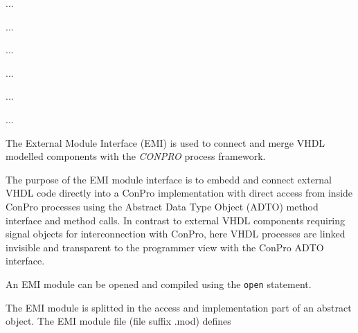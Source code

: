\documentclass[a4paper,12pt,twoside,english]{article}
\begin{document}
\def\thesubsubsection{\tocLXXXVI}
\secIII{\label{toclabelLXXXVI}\thesubsubsection}
...


\def\thesubsubsection{\tocLXXXVII}
\secIII{\label{toclabelLXXXVII}\thesubsubsection}
...


\def\thesubsubsection{\tocLXXXVIII}
\secIII{\label{toclabelLXXXVIII}\thesubsubsection}
...


\def\thesubsubsection{\tocLXXXIX}
\secIII{\label{toclabelLXXXIX}\thesubsubsection}
...


\def\thesubsubsection{\vrule width 0pt height 1.3 ex}

\def\thesubsection{\tocXC}
\secII{\label{toclabelXC}\thesubsection}
\def\thesubsubsection{\tocXCI}
\secIII{\label{toclabelXCI}\thesubsubsection}
...


\def\thesubsubsection{\tocXCII}
\secIII{\label{toclabelXCII}\thesubsubsection}
...

\vskip10pt
\def\thesubsubsection{\vrule width 0pt height 1.3 ex}

\def\thesubsection{\vrule width 0pt height 1.3 ex}

\def\thesection{\tocXCIII}
\secI{\label{toclabelXCIII}6\hfill\thesection}
The External Module Interface (EMI) is used to connect and merge VHDL modelled components with the {\sl
CONPRO} process framework. 


\vskip5pt
The purpose of the EMI module interface is to embedd and connect external VHDL code directly into a ConPro implementation with direct access from inside ConPro
processes using the Abstract Data Type Object (ADTO) method interface and method calls. In contrast to  external VHDL components requiring signal objects for
interconnection with ConPro, here VHDL processes are linked invisible and transparent to the programmer view with the ConPro ADTO interface.


\vskip5pt
An EMI module can be opened and compiled using the {\tt open} statement.


\vskip5pt
The EMI module is splitted in the access and implementation part of an abstract object.  The EMI module file (file suffix .mod) defines
\end{document}
